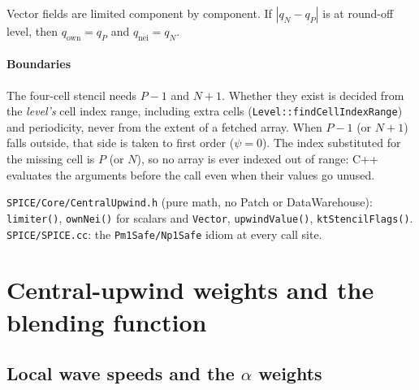 \documentclass[11pt]{article}
\newcommand{\code}[1]{\texttt{\small #1}}
\newcommand{\file}[1]{\texttt{\small\color{Moss}#1}}
\newcommand{\own}{\mathrm{own}}
\newcommand{\nei}{\mathrm{nei}}
\begin{document}
\noindent Vector fields are limited component by component. If $|q_N-q_P|$ is at round-off
level, then $q_\own=q_P$ and $q_\nei=q_N$.

\paragraph{Boundaries}
The four-cell stencil needs $P-1$ and $N+1$. Whether they exist is decided from the
\emph{level's} cell index range, including extra cells (\code{Level::findCellIndexRange}) and
periodicity, never from the extent of a fetched array. When $P-1$ (or $N+1$) falls outside,
that side is taken to first order ($\psi=0$). The index substituted for the missing cell is
$P$ (or $N$), so no array is ever indexed out of range: C++ evaluates the arguments before
the call even when their values go unused.

\begin{incode}
\file{SPICE/Core/CentralUpwind.h} (pure math, no Patch or DataWarehouse): \code{limiter()},
\code{ownNei()} for scalars and \code{Vector}, \code{upwindValue()}, \code{ktStencilFlags()}.\\
\file{SPICE/SPICE.cc}: the \code{Pm1Safe/Np1Safe} idiom at every call site.
\end{incode}

\section{Central-upwind weights and the blending function}\label{sec:weights}

\subsection{Local wave speeds and the \texorpdfstring{$\alpha$}{alpha} weights}
\end{document}
